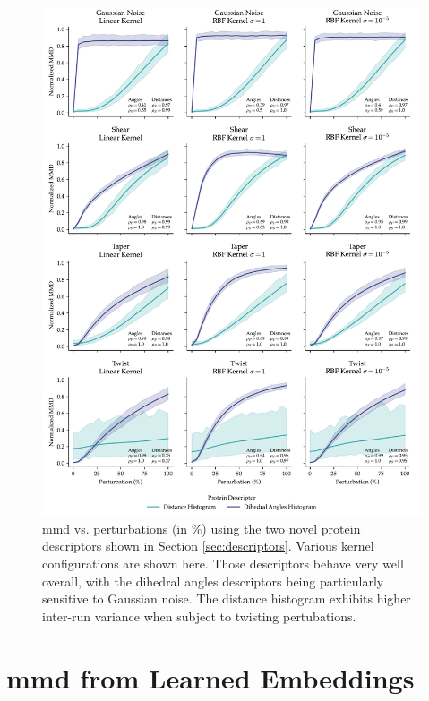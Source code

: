 \begin{figure}
  \includegraphics[width=\textwidth]{./figures/results/res_4.pdf}
  \caption[\acrshort{mmd} vs. perturbations using the two novel protein descriptors.]{\acrshort{mmd}
vs. perturbations (in \%) using the two novel protein descriptors shown in Section
\ref{sec:descriptors}. Various kernel configurations are shown here. Those
descriptors behave very well overall, with the dihedral angles descriptors being
particularly sensitive to Gaussian noise. The distance histogram exhibits
 higher inter-run variance when subject to twisting
pertubations.}
  \label{fig:protein_specific_descriptors}
\end{figure}

\section{\acrshort{mmd} from Learned Embeddings}

